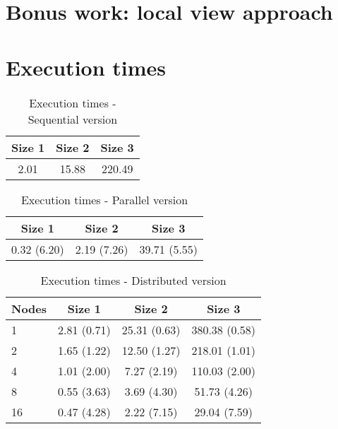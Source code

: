 \documentclass{article}
\begin{document}
\appendix

\section{Bonus work: local view approach}

\section{Execution times} \label{sec:executiontimes}

\begin{table}[H]
\centering
\begin{tabular}{|c|c|c|}
\hline
Size 1 & Size 2 & Size 3 \\
\hline
2.01 & 15.88 & 220.49 \\
\hline
\end{tabular}
\caption{Execution times - Sequential version} \label{tab:sequentialtimes}
\end{table}

\begin{table}[H]
\centering
\begin{tabular}{|c|c|c|}
\hline
Size 1 & Size 2 & Size 3 \\ \hline
0.32 (6.20) & 2.19 (7.26) & 39.71 (5.55) \\ \hline
\end{tabular}
\caption{Execution times - Parallel version} \label{tab:paralleltimes}
\end{table}

\begin{table}[H]
\centering
\begin{tabular}{|l|c|c|c|}
\hline
Nodes & Size 1 & Size 2 & Size 3 \\ \hline
1 & 2.81 (0.71) & 25.31 (0.63) & 380.38 (0.58) \\ \hline
2 & 1.65 (1.22) & 12.50 (1.27) & 218.01 (1.01) \\ \hline
4 & 1.01 (2.00) & 7.27 (2.19) & 110.03 (2.00) \\ \hline
8 & 0.55 (3.63) & 3.69 (4.30) & 51.73 (4.26) \\ \hline
16 & 0.47 (4.28) & 2.22 (7.15) & 29.04 (7.59) \\ \hline
\end{tabular}
\caption{Execution times - Distributed version} \label{tab:distributedtimes}
\end{table}
\end{document}
